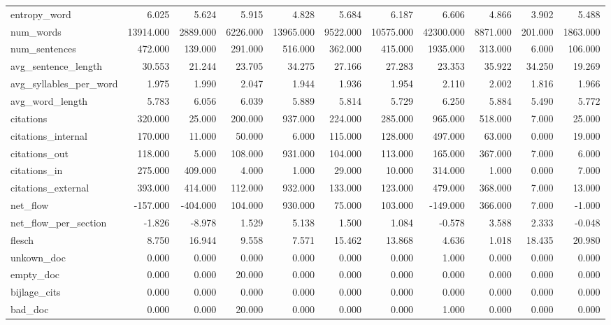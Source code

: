 \begin{tabular}{lrrrrrrrrrr}
\cline{1-11}
entropy\_word & 6.025 & 5.624 & 5.915 & 4.828 & 5.684 & 6.187 & 6.606 & 4.866 & 3.902 & 5.488 \\
\cline{1-11}
num\_words & 13914.000 & 2889.000 & 6226.000 & 13965.000 & 9522.000 & 10575.000 & 42300.000 & 8871.000 & 201.000 & 1863.000 \\
\cline{1-11}
num\_sentences & 472.000 & 139.000 & 291.000 & 516.000 & 362.000 & 415.000 & 1935.000 & 313.000 & 6.000 & 106.000 \\
\cline{1-11}
avg\_sentence\_length & 30.553 & 21.244 & 23.705 & 34.275 & 27.166 & 27.283 & 23.353 & 35.922 & 34.250 & 19.269 \\
\cline{1-11}
avg\_syllables\_per\_word & 1.975 & 1.990 & 2.047 & 1.944 & 1.936 & 1.954 & 2.110 & 2.002 & 1.816 & 1.966 \\
\cline{1-11}
avg\_word\_length & 5.783 & 6.056 & 6.039 & 5.889 & 5.814 & 5.729 & 6.250 & 5.884 & 5.490 & 5.772 \\
\cline{1-11}
citations & 320.000 & 25.000 & 200.000 & 937.000 & 224.000 & 285.000 & 965.000 & 518.000 & 7.000 & 25.000 \\
\cline{1-11}
citations\_internal & 170.000 & 11.000 & 50.000 & 6.000 & 115.000 & 128.000 & 497.000 & 63.000 & 0.000 & 19.000 \\
\cline{1-11}
citations\_out & 118.000 & 5.000 & 108.000 & 931.000 & 104.000 & 113.000 & 165.000 & 367.000 & 7.000 & 6.000 \\
\cline{1-11}
citations\_in & 275.000 & 409.000 & 4.000 & 1.000 & 29.000 & 10.000 & 314.000 & 1.000 & 0.000 & 7.000 \\
\cline{1-11}
citations\_external & 393.000 & 414.000 & 112.000 & 932.000 & 133.000 & 123.000 & 479.000 & 368.000 & 7.000 & 13.000 \\
\cline{1-11}
net\_flow & -157.000 & -404.000 & 104.000 & 930.000 & 75.000 & 103.000 & -149.000 & 366.000 & 7.000 & -1.000 \\
\cline{1-11}
net\_flow\_per\_section & -1.826 & -8.978 & 1.529 & 5.138 & 1.500 & 1.084 & -0.578 & 3.588 & 2.333 & -0.048 \\
\cline{1-11}
flesch & 8.750 & 16.944 & 9.558 & 7.571 & 15.462 & 13.868 & 4.636 & 1.018 & 18.435 & 20.980 \\
\cline{1-11}
unkown\_doc & 0.000 & 0.000 & 0.000 & 0.000 & 0.000 & 0.000 & 1.000 & 0.000 & 0.000 & 0.000 \\
\cline{1-11}
empty\_doc & 0.000 & 0.000 & 20.000 & 0.000 & 0.000 & 0.000 & 0.000 & 0.000 & 0.000 & 0.000 \\
\cline{1-11}
bijlage\_cits & 0.000 & 0.000 & 0.000 & 0.000 & 0.000 & 0.000 & 0.000 & 0.000 & 0.000 & 0.000 \\
\cline{1-11}
bad\_doc & 0.000 & 0.000 & 20.000 & 0.000 & 0.000 & 0.000 & 1.000 & 0.000 & 0.000 & 0.000 \\
\cline{1-11}
\bottomrule
\end{tabular}
